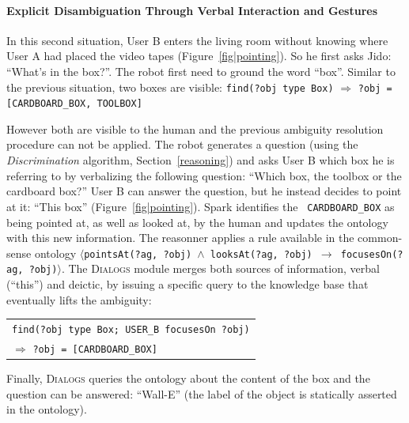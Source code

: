 \documentclass[preprint,3p,times]{elsarticle}
\newcommand{\concept}[1]{{\small \texttt{#1}}}
\newcommand{\stmt}[1]{{\footnotesize\tt$\langle$#1\relax$\rangle$}}
\begin{document}
\paragraph{Explicit Disambiguation Through Verbal Interaction and Gestures}

In this second situation, User B enters the living room without knowing where
User A had placed the video tapes (Figure~\ref{fig|pointing}). So he first asks
Jido: ``What's in the box?''. The robot first need to ground the word ``box''.
Similar to the previous situation, two boxes are visible: \concept{find(?obj
type Box)} $\Rightarrow$ \concept{?obj = [CARDBOARD\_BOX, TOOLBOX]}

However both are visible to the human and the previous ambiguity resolution
procedure can not be applied. The robot generates a question (using the
\emph{Discrimination} algorithm, Section~\ref{reasoning})
and asks User B which box he is referring to by verbalizing the following question: ``Which box, the toolbox or the
cardboard box?'' User B can answer the question, but he instead decides to point
at it: ``This box'' (Figure~\ref{fig|pointing}). {\sc Spark} identifies the {\tt
CARDBOARD\_BOX} as being pointed at, as well as looked at, by the human and updates the
ontology with this new information. The reasonner applies a rule available in the common-sense
ontology \stmt{pointsAt(?ag, ?obj) $\land$ looksAt(?ag, ?obj) $\to$
focusesOn(?ag, ?obj)}. The \textsc{Dialogs} module merges both
sources of information, verbal (``this'') and deictic, by issuing a specific
query to the knowledge base that eventually lifts the ambiguity:

\begin{center} 
    \begin{tabular}{l} 
        \concept{find(?obj type Box; USER\_B focusesOn ?obj)}\\ 
        \hspace{0.7cm}$\Rightarrow$ {\tt ?obj = [CARDBOARD\_BOX]}
    \end{tabular} 
\end{center}

Finally, \textsc{Dialogs} queries the ontology about the content of the box and
the question can be answered: ``Wall-E'' (the label of the object is statically
asserted in the ontology).

\end{document}
